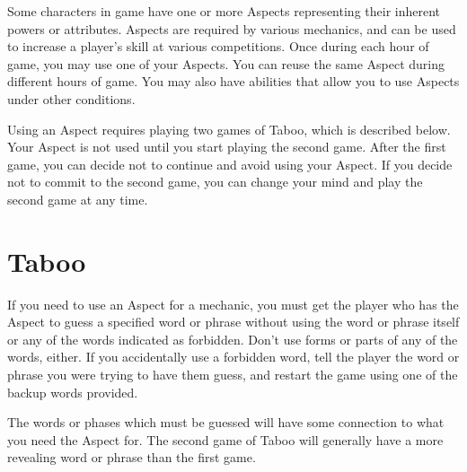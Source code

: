 \documentclass[green]{guardians}
\begin{document}
\name{\gAspect{}}

Some characters in game have one or more Aspects representing their inherent powers or attributes. Aspects are required by various mechanics, and can be used to increase a player's skill at various competitions. Once during each hour of game, you may use one of your Aspects. You can reuse the same Aspect during different hours of game. You may also have abilities that allow you to use Aspects under other conditions.



Using an Aspect requires playing two games of Taboo, which is described below. Your Aspect is not used until you start playing the second game. After the first game, you can decide not to continue and avoid using your Aspect. If you decide not to commit to the second game, you can change your mind and play the second game at any time.


\section{Taboo}

If you need to use an Aspect for a mechanic, you must get the player who has the Aspect to guess a specified word or phrase without using the word or phrase itself or any of the words indicated as forbidden. Don't use forms or parts of any of the words, either. If you accidentally use a forbidden word, tell the player the word or phrase you were trying to have them guess, and restart the game using one of the backup words provided.

The words or phases which must be guessed will have some connection to what you need the Aspect for. The second game of Taboo will generally have a more revealing word or phrase than the first game.

\end{document}

